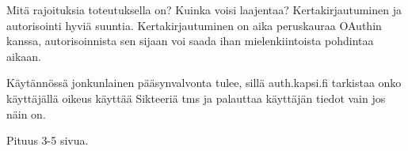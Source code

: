 Mitä rajoituksia toteutuksella on? Kuinka voisi laajentaa? Kertakirjautuminen ja autorisointi hyviä suuntia. Kertakirjautuminen on aika peruskauraa OAuthin kanssa, autorisoinnista sen sijaan voi saada ihan mielenkiintoista pohdintaa aikaan.

Käytännössä jonkunlainen pääsynvalvonta tulee, sillä auth.kapsi.fi tarkistaa onko käyttäjällä oikeus käyttää Sikteeriä tms ja palauttaa käyttäjän tiedot vain jos näin on.

Pituus 3-5 sivua.